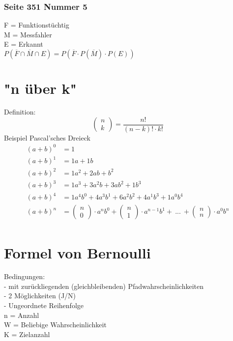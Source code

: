 \documentclass[a4paper,12pt]{article}
\begin{document}
\subsubsection*{Seite 351 Nummer 5}
F = Funktionstüchtig\\
M = Messfahler\\
E = Erkannt\\
$P(\overline{F} \cap \overline{M} \cap E) = P(\overline{F} \cdot P(\overline{M}) \cdot P(E))$
\pagebreak
\section*{"n über k"}
Definition:
$$\begin{pmatrix}n\\k\end{pmatrix} = \frac{n!}{(n - k)! \cdot k!}$$
Beispiel Pascal'sches Dreieck
\begin{equation}
\begin{split}
(a + b)^0 & = 1\\
(a + b)^1 & = 1a + 1b\\
(a + b)^2 & = 1a^2 + 2ab + b^2\\
(a + b)^3 & = 1a^3 + 3a^2b + 3ab^2 + 1b^3\\
(a + b)^4 & = 1a^4b^0 + 4a^3b^1 + 6a^2b^2 + 4a^1b^3 + 1a^0b^4\\
(a + b)^n & = \begin{pmatrix}n\\0\end{pmatrix} \cdot a^nb^0 + \begin{pmatrix}n\\1\end{pmatrix} \cdot a^{n-1}b^1 +\ ...\ + \begin{pmatrix}n\\n\end{pmatrix} \cdot a^0b^n\\
\end{split}
\end{equation}
\section*{Formel von Bernoulli}
\large{Bedingungen:}\\
- mit zurückliegenden (gleichbleibenden) Pfadwahrscheinlichkeiten\\
- 2 Möglichkeiten (J/N)\\
- Ungeordnete Reihenfolge\\
n = Anzahl\\
W = Beliebige Wahrscheinlichkeit\\
K = Zielanzahl\\ 
\end{document}
